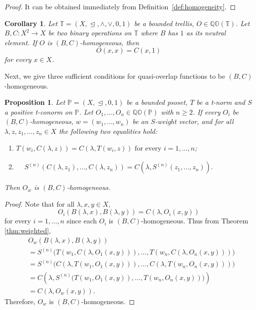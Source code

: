 \documentclass[preprint,12pt]{elsarticle}
\newtheorem{proposition}[theorem]{Proposition}
\newtheorem{corollary}[theorem]{Corollary}
\begin{document}
\begin{proof}
It can be obtained immediately from Definition~\ref{def:homogeneity}.
\end{proof}

\begin{corollary}\label{cor:homogeneity-diagonal}
Let $\mathbb{T}=(X,\trianglelefteq,\wedge,\vee,0,1)$ be a bounded trellis, $O\in\mathbb{QO}(\mathbb{T})$. Let $B,C:X^2\to X$ be two binary operations on $\mathbb{T}$ where $B$ has $1$ as its neutral element. If $O$ is $(B,C)$-homogeneous, then
$$
 O(x,x)=C(x,1)
$$
for every $x\in X$.
\end{corollary}

Next, we give three sufficient conditions for quasi-overlap functions to be $(B,C)$-homogeneous.
\begin{proposition}
Let $\mathbb{P}=(X,\trianglelefteq,0,1)$ be a bounded psoset, $T$ be a t-norm and $S$ a positive t-conorm on $\mathbb{P}$. Let $O_1,\ldots,O_n\in\mathbb{QO}(\mathbb{P})$ with $n\geq2$. If every $O_i$ be $(B,C)$-homogeneous, $w=(w_1,\ldots,w_n)$ be an $S$-weight vector, and for all $\lambda,z,z_1,\ldots,z_n\in X$ the following two equalities hold:
\begin{enumerate}[label=(\roman*)]
    \item $T(w_i,C(\lambda,z))=C(\lambda,T(w_i,z))\mbox{ for every }i=1,\ldots,n$;
\item $\begin{aligned}
&S^{(n)}(C(\lambda,z_1),\ldots,C(\lambda,z_n))
=C(\lambda,S^{(n)}(z_1,\ldots,z_n)).\end{aligned}$
\end{enumerate}
Then $O_w$ is $(B,C)$-homogeneous.
\end{proposition}

\begin{proof}
Note that for all $\lambda,x,y\in X$,
$$
 O_i(B(\lambda,x),B(\lambda,y))
 =C(\lambda,O_i(x,y))
 $$ for every $i=1,\ldots,n$ since each $O_i$ is $(B,C)$-homogeneous.
Thus from Theorem \ref{thm:weighted},
$$
\begin{aligned}
&O_w(B(\lambda,x),B(\lambda,y))\\
&=S^{(n)}\bigl(
T(w_1,C(\lambda,O_1(x,y))),\ldots,
T(w_n,C(\lambda,O_n(x,y)))
\bigr)\\
&=S^{(n)}\bigl(
C(\lambda,T(w_1,O_1(x,y))),\ldots,
C(\lambda,T(w_n,O_n(x,y)))
\bigr)\\
&=C\!\left(
\lambda,
S^{(n)}\bigl(
T(w_1,O_1(x,y)),\ldots,
T(w_n,O_n(x,y))
\bigr)
\right)\\
&=C(\lambda,O_w(x,y)).
\end{aligned}
$$
Therefore, $O_w$ is $(B,C)$-homogeneous.
\end{proof}
\end{document}
